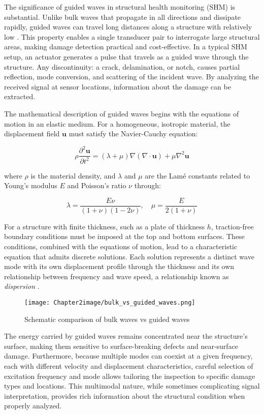 \documentclass[12pt,a4paper]{report}
\begin{document}
The significance of guided waves in structural health monitoring (SHM) is substantial. Unlike bulk waves that propagate in all directions and dissipate rapidly, guided waves can travel long distances along a structure with relatively low  \citep{Yang2025Dataset}. This property enables a single transducer pair to interrogate large structural areas, making damage detection practical and cost-effective. In a typical SHM setup, an actuator generates a pulse that travels as a guided wave through the structure. Any discontinuity: a crack, delamination, or notch, causes partial reflection, mode conversion, and scattering of the incident wave. By analyzing the received signal at sensor locations, information about the damage can be extracted.

The mathematical description of guided waves begins with the equations of motion in an elastic medium. For a homogeneous, isotropic material, the displacement field $\mathbf{u}$ must satisfy the Navier-Cauchy equation:

\begin{equation}
\rho \frac{\partial^2 \mathbf{u}}{\partial t^2} = (\lambda + \mu) \nabla (\nabla \cdot \mathbf{u}) + \mu \nabla^2 \mathbf{u}
\end{equation}

where $\rho$ is the material density, and $\lambda$ and $\mu$ are the Lamé constants related to Young's modulus $E$ and Poisson's ratio $\nu$ through:

\begin{equation}
\lambda = \frac{E\nu}{(1+\nu)(1-2\nu)}, \quad \mu = \frac{E}{2(1+\nu)}
\end{equation}

For a structure with finite thickness, such as a plate of thickness $h$, traction-free boundary conditions must be imposed at the top and bottom surfaces. These conditions, combined with the equations of motion, lead to a characteristic equation that admits discrete solutions. Each solution represents a distinct wave mode with its own displacement profile through the thickness and its own relationship between frequency and wave speed, a relationship known as \textit{dispersion} \citep{rose2014ultrasonic}.

\begin{figure}[h!]
\centering
\texttt{[image: Chapter2image/bulk\_vs\_guided\_waves.png]}
\caption{Schematic comparison of bulk waves vs guided waves}
\end{figure}

The energy carried by guided waves remains concentrated near the structure's surface, making them sensitive to surface-breaking defects and near-surface damage. Furthermore, because multiple modes can coexist at a given frequency, each with different velocity and displacement characteristics, careful selection of excitation frequency and mode allows tailoring the inspection to specific damage types and locations. This multimodal nature, while sometimes complicating signal interpretation, provides rich information about the structural condition when properly analyzed.
\end{document}

